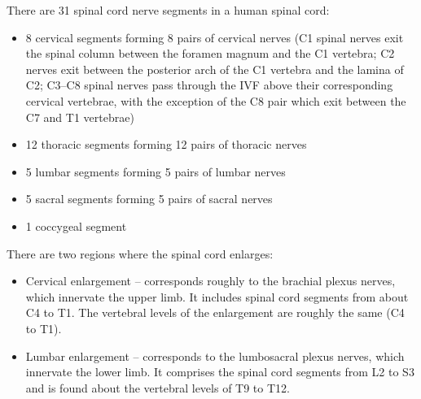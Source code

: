 There are 31 spinal cord nerve segments in a human spinal cord:

\begin{itemize}
\tightlist
\item
  8 cervical segments forming 8 pairs of cervical nerves (C1 spinal nerves exit the spinal column between the foramen magnum and the C1 vertebra; C2 nerves exit between the posterior arch of the C1 vertebra and the lamina of C2; C3--C8 spinal nerves pass through the IVF above their corresponding cervical vertebrae, with the exception of the C8 pair which exit between the C7 and T1 vertebrae)
\item
  12 thoracic segments forming 12 pairs of thoracic nerves
\item
  5 lumbar segments forming 5 pairs of lumbar nerves
\item
  5 sacral segments forming 5 pairs of sacral nerves
\item
  1 coccygeal segment
\end{itemize}

There are two regions where the spinal cord enlarges:

\begin{itemize}
\tightlist
\item
  Cervical enlargement -- corresponds roughly to the brachial plexus nerves, which innervate the upper limb. It includes spinal cord segments from about C4 to T1. The vertebral levels of the enlargement are roughly the same (C4 to T1).
\item
  Lumbar enlargement -- corresponds to the lumbosacral plexus nerves, which innervate the lower limb. It comprises the spinal cord segments from L2 to S3 and is found about the vertebral levels of T9 to T12.
\end{itemize}


